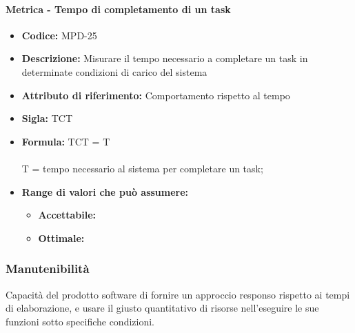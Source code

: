                   \paragraph{Metrica - Tempo di completamento di un task} 
            \begin{itemize}
            \item  \textbf{Codice:} MPD-25
            \item  \textbf{Descrizione:} Misurare il tempo necessario a completare un task in determinate condizioni di carico del sistema 
           \item   \textbf{Attributo di riferimento:} Comportamento rispetto al tempo
           \item   \textbf{Sigla:} TCT
           \item   \textbf{Formula:} TCT = T\\ \\
            T = tempo necessario al sistema per completare un task;
            \item \textbf{Range di valori che può assumere:}
        \begin{itemize}
            \item \textbf{Accettabile:} 
            \item \textbf{Ottimale:} 
        \end{itemize}
       \end{itemize}
       
            \subsubsection{Manutenibilità}
   Capacità del prodotto software di fornire un approccio responso rispetto ai tempi di elaborazione, e usare il giusto quantitativo di risorse nell'eseguire le sue funzioni sotto specifiche condizioni. 

